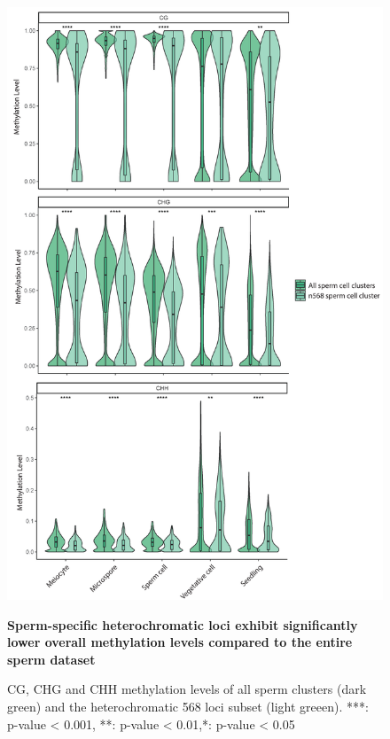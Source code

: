 \begin{figure}[htbp!] 
\centering    
    \includegraphics[width=1\textwidth]{Chapter2/Figs/Figure10_SC_hetero_clusters_methylation.pdf}
\caption{\textbf{Sperm-specific heterochromatic loci exhibit significantly lower overall methylation levels compared to the entire sperm dataset}}
\label{fig:SC_hetero_clusters}
\captionsetup{font=small}
    \caption*{CG, CHG and CHH methylation levels of all sperm clusters (dark green) and the heterochromatic 568 loci subset (light greeen). ***: p-value < 0.001, **: p-value < 0.01,*: p-value < 0.05}
\end{figure}

